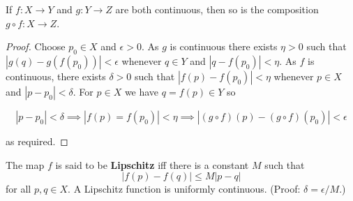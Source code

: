 \documentclass[10pt,a4paper,UTF8]{article}
\begin{document}
\begin{proposition}
 If \(f:X\to Y\) and \(g:Y\to Z\) are both continuous, then so is the
composition \(g\circ f:X\to Z\).
\end{proposition}

\begin{proof}
 Choose \(p_0\in X\) and \(\epsilon > 0\). As \(g\) is continuous there exists \(\eta > 0\)
such that \(|g(q)-g(f(p_0))| < \epsilon\) whenever \(q\in Y\) and \(|q-f(p_0)| < \eta\).
As \(f\) is continuous, there exists \(\delta > 0\) such that \(|f(p)-f(p_0)| < \eta\)
whenever \(p\in X\) and \(|p-p_0| < \delta\). For \(p\in X\) we have \(q=f(p)\in Y\) so

\[ |p-p_0| < \delta\implies |f(p)=f(p_0)| < \eta\implies |(g\circ f)(p)-(g\circ f)(p_0)| < \epsilon\]


as required.
\end{proof}



  The map \(f\) is said to be \textbf{Lipschitz} iff there is
a constant \(M\) such that \[   |f(p)-f(q)|\le M|p-q|\]
for all \(p,q\in X\). A Lipschitz function is uniformly continuous.
(Proof: \(\delta=\epsilon/M\).)
\end{document}
